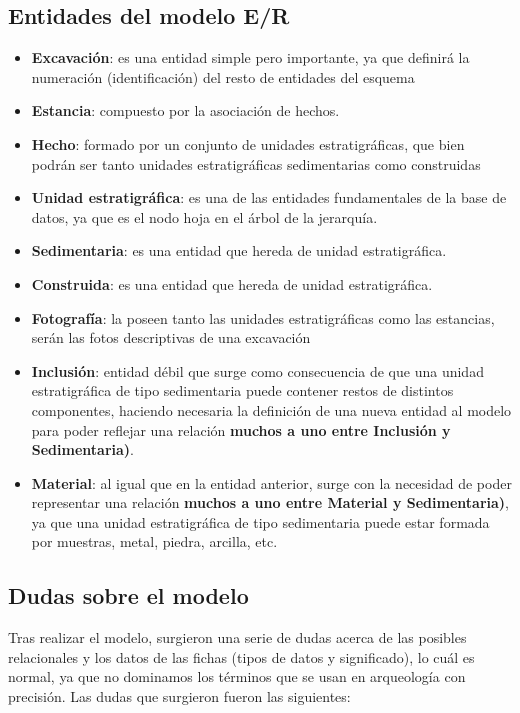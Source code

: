    \subsection{Entidades del modelo E/R}

        \begin{itemize}
            \item \textbf{Excavación}: es una entidad simple pero importante, ya que definirá
            la numeración (identificación) del resto de entidades del esquema 
            \item \textbf{Estancia}: compuesto por la asociación de hechos.
            \item \textbf{Hecho}: formado por un conjunto de unidades estratigráficas, que
            bien podrán ser tanto unidades estratigráficas sedimentarias como construidas 
            \item \textbf{Unidad estratigráfica}: es una de las entidades fundamentales de
            la base de datos, ya que es el nodo hoja en el árbol de la jerarquía.
            \item \textbf{Sedimentaria}: es una entidad que hereda de unidad estratigráfica.
            \item \textbf{Construida}: es una entidad que hereda de unidad estratigráfica.
            \item \textbf{Fotografía}: la poseen tanto las unidades estratigráficas como las
            estancias, serán las fotos descriptivas de una excavación
            \item \textbf{Inclusión}: entidad débil que surge como consecuencia de que una
            unidad estratigráfica de tipo sedimentaria puede contener restos de distintos
            componentes, haciendo necesaria la definición de una nueva entidad al modelo
            para poder reflejar una relación \textbf{muchos a uno entre Inclusión y
            Sedimentaria)}.
            \item \textbf{Material}: al igual que en la entidad anterior, surge con la
            necesidad de poder representar una relación \textbf{muchos a uno entre Material
            y Sedimentaria)}, ya que una unidad estratigráfica de tipo sedimentaria puede
            estar formada por muestras, metal, piedra, arcilla, etc.
        \end{itemize}


    \subsection{Dudas sobre el modelo} \label{subsec: doubts}
    Tras realizar el modelo, surgieron una serie de dudas acerca de las posibles relacionales
    y los datos de las fichas (tipos de datos y significado), lo cuál es normal, ya que no
    dominamos los términos que se usan en arqueología con precisión. Las dudas que surgieron
    fueron las siguientes:

